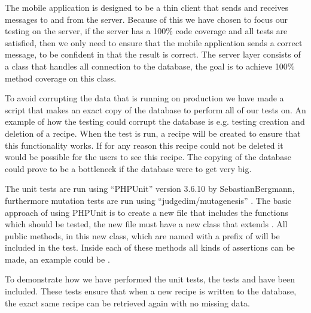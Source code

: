 The mobile application is designed to be a thin client that sends and receives messages to and from the server. 
Because of this we have chosen to focus our testing on the server, if the server has a 100\% code coverage and all tests are satisfied, then we only need to ensure that the mobile application sends a correct message, to be confident in that the result is correct.
The server layer consists of a class that handles all connection to the database, the goal is to achieve 100\% method coverage on this class.

To avoid corrupting the data that is running on production we have made a script that makes an exact copy of the database to perform all of our tests on. An example of how the testing could corrupt the database is e.g. testing creation and deletion of a recipe. 
When the test is run, a recipe will be created to ensure that this functionality works. 
If for any reason this recipe could not be deleted it would be possible for the users to see this recipe. 
The copying of the database could prove to be a bottleneck if the database were to get very big.

The unit tests are run using ``PHPUnit'' version 3.6.10 by Sebastian\linebreak Bergmann\cite{phpunit}, furthermore mutation tests are run using ``judgedim/mutagenesis'' \cite{mutagenesis}. The basic approach of using PHPUnit is to create a new file that includes the functions which should be tested, the new file must have a new class that extends . All public methods, in this new class, which are named with a prefix of  will be included in the test. Inside each of these methods all kinds of assertions can be made, an example could be .

To demonstrate how we have performed the unit tests, the tests \linebreak{} and  have been included. These tests ensure that when a new recipe is written to the database, the exact same recipe can be retrieved again with no missing data.

